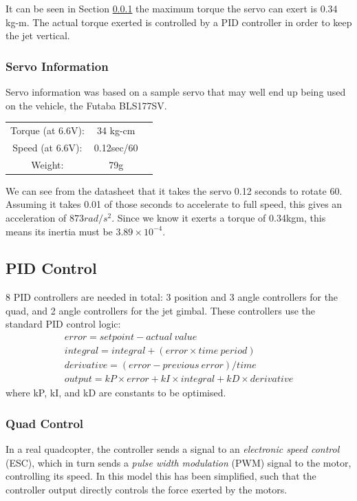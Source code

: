 \documentclass[11pt,twoside]{article}
\begin{document}
It can be seen in Section \ref{servo_info} the maximum torque the servo can exert is 0.34 kg-m. The actual torque exerted is controlled by a PID controller in order to keep the jet vertical.

\subsubsection{Servo Information}  \label{servo_info}
Servo information was based on a sample servo that may well end up being used on the vehicle, the Futaba BLS177SV.

\begin{center}
\begin{tabular}{ccc}
    Torque (at 6.6V): & 34 kg-cm \\
    Speed (at 6.6V): & 0.12sec/60\textdegree{} \\
    Weight: & 79g \\
\end{tabular}
\end{center}

We can see from the datasheet that it takes the servo 0.12 seconds to rotate 60\textdegree{}. Assuming it takes 0.01 of those seconds to accelerate to full speed, this gives an acceleration of $873rad/s^2$. Since we know it exerts a torque of 0.34kgm, this means its inertia must be $3.89\times10^{-4}$.

\subsection{PID Control} \label{sec:PID_Control}
8 PID controllers are needed in total: 3 position and 3 angle controllers for the quad, and 2 angle controllers for the jet gimbal. These controllers use the standard PID control logic:
\begin{eqnarray*}
    error = setpoint - actual\ value \\
    integral = integral + (error \times time\ period) \\
    derivative = (error - previous\ error)/time \\
    output = kP \times error + kI \times integral + kD \times derivative
\end{eqnarray*}
where kP, kI, and kD are constants to be optimised.

\subsubsection{Quad Control}
In a real quadcopter, the controller sends a signal to an \emph{electronic speed control} (ESC), which in turn sends a \emph{pulse width modulation} (PWM) signal to the motor, controlling its speed. In this model this has been simplified, such that the controller output directly controls the force exerted by the motors.
\end{document}
